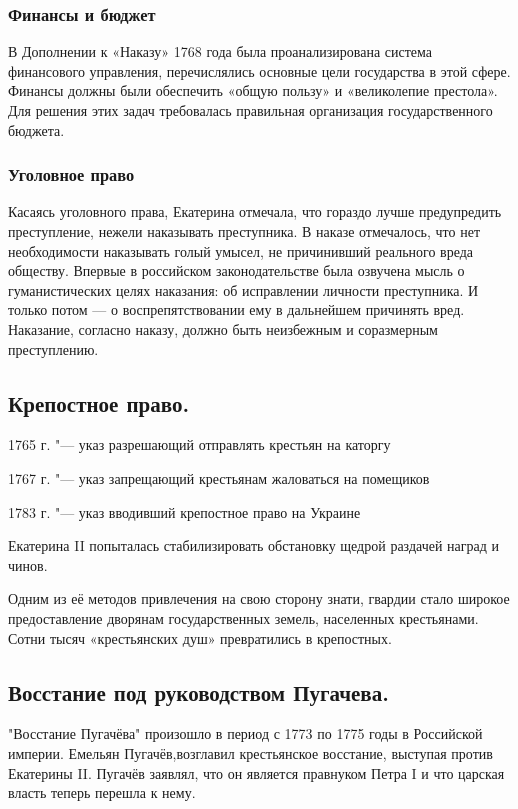 \subsubsection{Финансы и бюджет}

В Дополнении к «Наказу» 1768 года была проанализирована система финансового управления, перечислялись основные цели государства в этой сфере. Финансы должны были обеспечить «общую пользу» и «великолепие престола». Для решения этих задач требовалась правильная организация государственного бюджета.

\subsubsection{Уголовное право}

Касаясь уголовного права, Екатерина отмечала, что гораздо лучше предупредить преступление, нежели наказывать преступника. В наказе отмечалось, что нет необходимости наказывать голый умысел, не причинивший реального вреда обществу. Впервые в российском законодательстве была озвучена мысль о гуманистических целях наказания: об исправлении личности преступника. И только потом — о воспрепятствовании ему в дальнейшем причинять вред.  Наказание, согласно наказу, должно быть неизбежным и соразмерным преступлению.

\subsection{Крепостное право.}

1765 г. "--- указ разрешающий отправлять крестьян на каторгу

1767 г. "--- указ запрещающий крестьянам жаловаться на помещиков

1783 г. "--- указ вводивший крепостное право на Украине

Екатерина II попыталась стабилизировать обстановку щедрой раздачей наград и чинов. 

Одним из её методов привлечения на свою сторону знати, гвардии стало широкое предоставление дворянам государственных земель, населенных крестьянами. Сотни тысяч «крестьянских душ» превратились в крепостных.

\subsection{Восстание под руководством Пугачева.}

"Восстание Пугачёва" произошло в период с 1773 по 1775 годы в Российской империи. Емельян Пугачёв,возглавил крестьянское восстание, выступая против Екатерины II. Пугачёв заявлял, что он является правнуком Петра I и что царская власть теперь перешла к нему.
 
